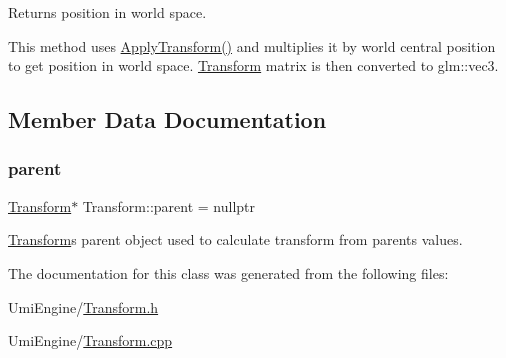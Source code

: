 Returns position in world space. 

This method uses \mbox{\hyperlink{class_transform_a550c9c8417c6d288e6352d6cc424a0e9}{Apply\+Transform()}} and multiplies it by world central position to get position in world space. \mbox{\hyperlink{class_transform}{Transform}} matrix is then converted to glm\+::vec3. 

\subsection{Member Data Documentation}
\mbox{\label{class_transform_aa1e92491c9905869a108ec09a08e5eb4}} 
\subsubsection{\texorpdfstring{parent}{parent}}
{\footnotesize\ttfamily \mbox{\hyperlink{class_transform}{Transform}}$\ast$ Transform\+::parent = nullptr}



\mbox{\hyperlink{class_transform}{Transform}}\textquotesingle{}s parent object used to calculate transform from parent\textquotesingle{}s values. 



The documentation for this class was generated from the following files\+:\begin{DoxyCompactItemize}
\item 
Umi\+Engine/\mbox{\hyperlink{_transform_8h}{Transform.\+h}}\item 
Umi\+Engine/\mbox{\hyperlink{_transform_8cpp}{Transform.\+cpp}}\end{DoxyCompactItemize}
